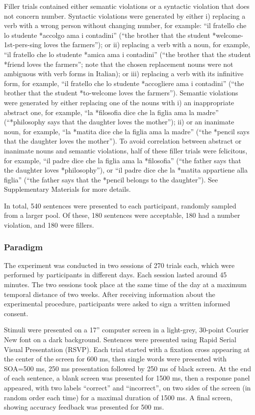 Filler trials contained either semantic violations or a syntactic violation that does not concern number. Syntactic violations were generated by either i) replacing a verb with a wrong person without changing number, for example: ``il fratello che lo studente *accolgo ama i contadini'' (``the brother that the student *welcome-1st-pers-sing loves the farmers''); or ii) replacing a verb with a noun, for example, ``il fratello che lo studente *amica ama i contadini'' (``the brother that the student *friend loves the farmers''; note that the chosen replacement nouns were not ambiguous with verb forms in Italian); or iii) replacing a verb with its infinitive form, for example, ``il fratello che lo studente *accogliere ama i contadini'' (``the brother that the student *to-welcome loves the farmers''). Semantic violations were generated by either replacing one of the nouns with i) an inappropriate abstract one, for example, ``la *filosofia dice che la figlia ama la madre'' (``*philosophy says that the daughter loves the mother''); ii) or an inanimate noun, for example, ``la *matita dice che la figlia ama la madre'' (``the *pencil says that the daughter loves the mother''). To avoid correlation between abstract or inanimate nouns and semantic violations, half of these filler trials were felicitous, for example, ``il padre dice che la figlia ama la *filosofia'' (``the father says that the daughter loves *philosophy''), or ``il padre dice che la *matita appartiene alla figlia'' (``the father says that the *pencil belongs to the daughter''). See Supplementary Materials for more details.

In total, 540 sentences were presented to each participant, randomly sampled from a larger pool. Of these, 180 sentences were acceptable, 180 had a number violation, and 180 were fillers.

\subsubsection{Paradigm}
The experiment was conducted in two sessions of 270 trials each, which were performed by participants in different days. Each session lasted around 45 minutes. The two sessions took place at the same time of the day at a maximum temporal distance of two weeks. After receiving information about the experimental procedure, participants were asked to sign a written informed consent. 

Stimuli were presented on a 17” computer screen in a light-grey, 30-point Courier New font on a dark background. Sentences were presented using Rapid Serial Visual Presentation (RSVP). Each trial started with a fixation cross appearing at the center of the screen for 600 ms, then single words were presented with SOA=500 ms, 250 ms presentation followed by 250 ms of black screen. At the end of each sentence, a blank screen was presented for 1500 ms, then a response panel appeared, with two labels “correct” and “incorrect”, on two sides of the screen (in random order each time) for a maximal duration of 1500 ms. A final screen, showing accuracy feedback was presented for 500 ms.

